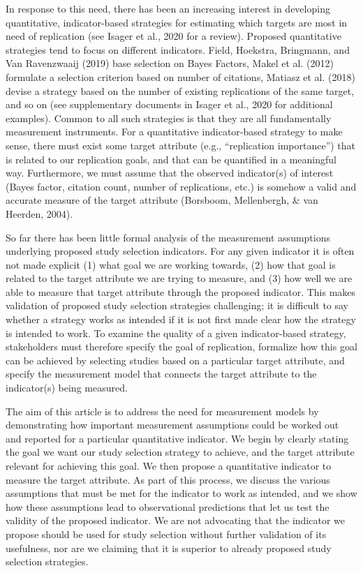 \documentclass[
  english,
  man,floatsintext]{apa6}
\begin{document}
In response to this need, there has been an increasing interest in developing quantitative, indicator-based strategies for estimating which targets are most in need of replication (see Isager et al., 2020 for a review). Proposed quantitative strategies tend to focus on different indicators. Field, Hoekstra, Bringmann, and Van Ravenzwaaij (2019) base selection on Bayes Factors, Makel et al. (2012) formulate a selection criterion based on number of citations, Matiasz et al. (2018) devise a strategy based on the number of existing replications of the same target, and so on (see supplementary documents in Isager et al., 2020 for additional examples). Common to all such strategies is that they are all fundamentally measurement instruments. For a quantitative indicator-based strategy to make sense, there must exist some target attribute (e.g., ``replication importance'') that is related to our replication goals, and that can be quantified in a meaningful way. Furthermore, we must assume that the observed indicator(s) of interest (Bayes factor, citation count, number of replications, etc.) is somehow a valid and accurate measure of the target attribute (Borsboom, Mellenbergh, \& van Heerden, 2004).

So far there has been little formal analysis of the measurement assumptions underlying proposed study selection indicators. For any given indicator it is often not made explicit (1) what goal we are working towards, (2) how that goal is related to the target attribute we are trying to measure, and (3) how well we are able to measure that target attribute through the proposed indicator. This makes validation of proposed study selection strategies challenging; it is difficult to say whether a strategy works as intended if it is not first made clear how the strategy is intended to work. To examine the quality of a given indicator-based strategy, stakeholders must therefore specify the goal of replication, formalize how this goal can be achieved by selecting studies based on a particular target attribute, and specify the measurement model that connects the target attribute to the indicator(s) being measured.

The aim of this article is to address the need for measurement models by demonstrating how important measurement assumptions could be worked out and reported for a particular quantitative indicator. We begin by clearly stating the goal we want our study selection strategy to achieve, and the target attribute relevant for achieving this goal. We then propose a quantitative indicator to measure the target attribute. As part of this process, we discuss the various assumptions that must be met for the indicator to work as intended, and we show how these assumptions lead to observational predictions that let us test the validity of the proposed indicator. We are not advocating that the indicator we propose should be used for study selection without further validation of its usefulness, nor are we claiming that it is superior to already proposed study selection strategies.
\end{document}

